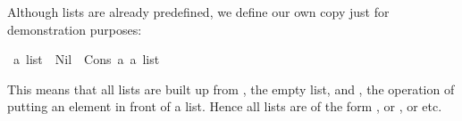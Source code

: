 \begin{isabellebody}
\begin{isamarkuptxt}
Although lists are already predefined, we define our own copy just for
demonstration purposes:%
\end{isamarkuptxt}%
\isamarkuptrue%
%
\endisatagproof
{\isafoldproof}%
%
\isadelimproof
%
\endisadelimproof
{}\isamarkupfalse%
\ {}a\ list\ {}\ Nil\ {}\ Cons\ {}{}a{}\ {}{}{}a\ list{}{}%
\begin{isamarkuptext}%
This means that all lists are built up from , the empty
list, and , the operation of putting an element in front of a
list.  Hence all lists are of the form , or ,
or  etc.


\end{isamarkuptext}
\end{isabellebody}

